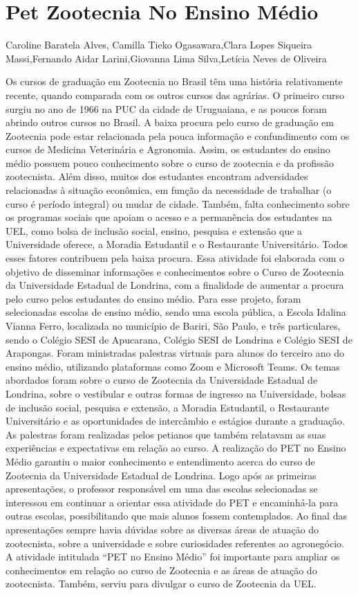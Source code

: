 \section*{Pet Zootecnia No Ensino Médio}

Caroline Baratela Alves, Camilla Tieko Ogasawara,Clara Lopes Siqueira Massi,Fernando Aidar Larini,Giovanna Lima Silva,Letícia Neves de Oliveira

Os cursos de graduação em Zootecnia no Brasil têm uma história relativamente recente, quando
comparada com os outros cursos das agrárias. O primeiro curso surgiu no ano de 1966 na PUC
da cidade de Uruguaiana, e as poucos foram abrindo outros cursos no Brasil. A baixa procura
pelo curso de graduação em Zootecnia pode estar relacionada pela pouca informação e
confundimento com os cursos de Medicina Veterinária e Agronomia. Assim, os estudantes do
ensino médio possuem pouco conhecimento sobre o curso de zootecnia e da profissão
zootecnista. Além disso, muitos dos estudantes encontram adversidades relacionadas à situação
econômica, em função da necessidade de trabalhar (o curso é período integral) ou mudar de
cidade. Também, falta conhecimento sobre os programas sociais que apoiam o acesso e a
permanência dos estudantes na UEL, como bolsa de inclusão social, ensino, pesquisa e extensão
que a Universidade oferece, a Moradia Estudantil e o Restaurante Universitário. Todos esses
fatores contribuem pela baixa procura. Essa atividade foi elaborada com o objetivo de disseminar
informações e conhecimentos sobre o Curso de Zootecnia da Universidade Estadual de Londrina,
com a finalidade de aumentar a procura pelo curso pelos estudantes do ensino médio. Para esse
projeto, foram selecionadas escolas de ensino médio, sendo uma escola pública, a Escola Idalina
Vianna Ferro, localizada no município de Bariri, São Paulo, e três particulares, sendo o Colégio
SESI de Apucarana, Colégio SESI de Londrina e Colégio SESI de Arapongas. Foram
ministradas palestras virtuais para alunos do terceiro ano do ensino médio, utilizando
plataformas como Zoom e Microsoft Teams. Os temas abordados foram sobre o curso de
Zootecnia da Universidade Estadual de Londrina, sobre o vestibular e outras formas de ingresso
na Universidade, bolsas de inclusão social, pesquisa e extensão, a Moradia Estudantil, o
Restaurante Universitário e as oportunidades de intercâmbio e estágios durante a graduação. As
palestras foram realizadas pelos petianos que também relatavam as suas experiências e
expectativas em relação ao curso. A realização do PET no Ensino Médio garantiu o maior
conhecimento e entendimento acerca do curso de Zootecnia da Universidade Estadual de
Londrina. Logo após as primeiras apresentações, o professor responsável em uma das escolas
selecionadas se interessou em continuar a orientar essa atividade do PET e encaminhá-la para
outras escolas, possibilitando que mais alunos fossem contemplados. Ao final das apresentações
sempre havia dúvidas sobre as diversas áreas de atuação do zootecnista, sobre a universidade e
sobre curiosidades referentes ao agronegócio. A atividade intitulada “PET no Ensino Médio” foi
importante para ampliar os conhecimentos em relação ao curso de Zootecnia e as áreas de
atuação do zootecnista. Também, serviu para divulgar o curso de Zootecnia da UEL.

